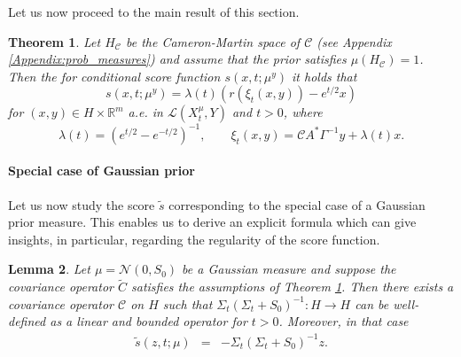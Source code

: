 \documentclass[10pt]{article} %
\newcommand{\R}{\mathbb{R}}
\theoremstyle{plain}
\newtheorem{theorem}{Theorem}[section]
\newtheorem{lemma}[theorem]{Lemma}
\theoremstyle{definition}
\theoremstyle{remark}
\renewcommand{\L}{\mathscr{L}}
\newcommand{\C}{\mathcal C}
\newcommand{\N}{\mathcal N}
\begin{document}
Let us now proceed to the main result of this section.
\begin{theorem}\label{thm:score_id1 infinite dimension}
Let $H_{\C}$ be the Cameron-Martin space of $\C$ (see Appendix \ref{Appendix:prob_measures}) and assume that the prior satisfies $\mu(H_{\C}) = 1$.
Then the for conditional score function $s(x,t;\mu^y)$ it holds that
\begin{equation}
    \label{eq:conditional_score_id}
    s(x, t; \mu^y) = \lambda(t) \left(  r\left(\xi_t(x, y)\right)- e^{t/2}x \right)
\end{equation}
for $(x,y) \in H \times \R^m$ a.e. in $\L(X_t^\mu, Y)$ and $t>0$, where
\begin{equation}
	\label{eq:lambda}
	\lambda(t) = (e^{t/2} - e^{-t/2})^{-1}, \qquad \xi_t(x,y) =  \C A^* \Gamma^{-1} y + \lambda(t) x.
\end{equation}
\end{theorem}


\paragraph{Special case of Gaussian prior}
Let us now study the score $\tilde s$ corresponding to the special case of a Gaussian prior measure. This enables us to derive an explicit formula which can give insights, in particular, regarding the regularity of the score function.

\begin{lemma}\label{lem: score function is compact}
       Let $\mu = \N(0, S_0)$ be a Gaussian measure and suppose the covariance operator $\widetilde{C}$ satisfies the assumptions of Theorem \ref{thm:score_id1 infinite dimension}. Then there exists a covariance operator $\C$ on $H$ such that $\Sigma_t (\Sigma_t + S_0)^{-1}: H\to H$ can be well-defined as a linear and bounded operator for $t>0$.
       Moreover, in that case
        \begin{eqnarray*}
        \tilde s(z, t; \mu) & = & -\Sigma_t (\Sigma_t + S_0)^{-1}z.
\end{eqnarray*}
\end{lemma}
\end{document}
